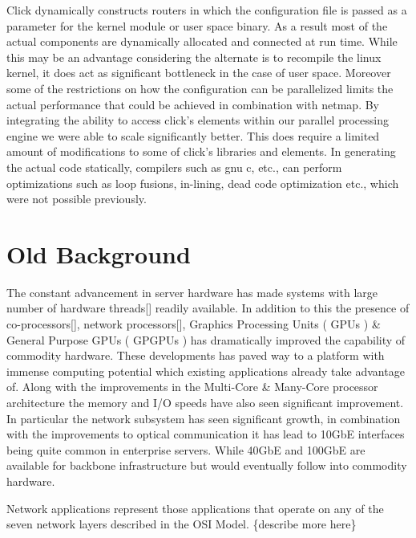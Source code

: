 \documentclass[conference]{IEEEtran}
\begin{document}
Click dynamically constructs routers in which the configuration file is passed as a parameter for the kernel module or user space binary. As a result most of the actual components are dynamically allocated and connected at run time. While this may be an advantage considering the alternate is to recompile the linux kernel, it does act as significant bottleneck in the case of user space. Moreover some of the restrictions on how the configuration can be parallelized limits the actual performance that could be achieved in combination with netmap. By integrating the ability to access click's elements within our parallel processing engine we were able to scale significantly better. This does require a limited amount of modifications to some of click's libraries and elements. In generating the actual code statically, compilers such as gnu c, etc., can perform optimizations such as loop fusions, in-lining, dead code optimization etc., which were not possible previously.

\section{Old Background}

The constant advancement in server hardware has made systems with large number of hardware threads[] readily available. In addition to this the presence of co-processors[], network processors[], Graphics Processing Units ( GPUs ) \& General Purpose GPUs ( GPGPUs ) has dramatically improved the capability of commodity hardware. These developments has paved way to a platform with immense computing potential which existing applications already take advantage of. Along with the improvements in the Multi-Core \& Many-Core processor architecture the memory and I/O speeds have also seen significant improvement. In particular the network subsystem has seen significant growth, in combination with the improvements to optical communication it has lead to 10GbE interfaces being quite common in enterprise servers. While 40GbE and 100GbE are available for backbone infrastructure but would eventually follow into commodity hardware. 

Network applications represent those applications that operate on any of the seven network layers described in the OSI Model. \{describe more here\}
\end{document}
